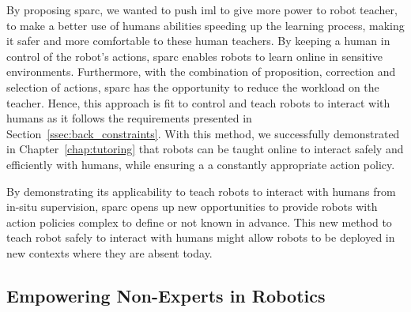 By proposing \gls{sparc}, we wanted to push \gls{iml} to give more power to robot teacher, to make a better use of humans abilities speeding up the learning process, making it safer and more comfortable to these human teachers. By keeping a human in control of the robot's actions, \gls{sparc} enables robots to learn online in sensitive environments.%
Furthermore, with the combination of proposition, correction and selection of actions, \gls{sparc} has the opportunity to reduce the workload on the teacher. Hence, this approach is fit to control and teach robots to interact with humans as it follows the requirements presented in Section~\ref{ssec:back_constraints}. With this method, we successfully demonstrated in Chapter~\ref{chap:tutoring} that robots can be taught online to interact safely and efficiently with humans, while ensuring a a constantly appropriate action policy. 

By demonstrating its applicability to teach robots to interact with humans from in-situ supervision, \gls{sparc} opens up new opportunities to provide robots with action policies complex to define or not known in advance. This new method to teach robot safely to interact with humans might allow robots to be deployed in new contexts where they are absent today.


\subsection{Empowering Non-Experts in Robotics}


